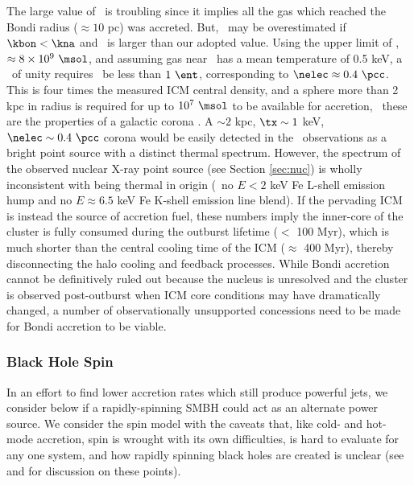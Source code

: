 \documentclass[11pt, preprint]{aastex}
\begin{document}
The large value of \dmb\ is troubling since it implies all the gas
which reached the Bondi radius ($\approx 10$ pc) was accreted. But,
\dmb\ may be overestimated if $\kbon < \kna$ and \mbh\ is larger than
our adopted value. Using the upper limit of \mbh, $\approx 8 \times
10^9 ~\msol$, and assuming gas near \rbon\ has a mean temperature of
0.5 keV, a \dmb\ of unity requires \kbon\ be less than $1 ~\ent$,
corresponding to $\nelec \approx 0.4 ~\pcc$. This is four times the
measured ICM central density, and a sphere more than 2 kpc in radius
is required for up to $10^7 ~\msol$ to be available for accretion,
\ie\ these are the properties of a galactic corona \citep{coronae}. A
$\sim 2$ kpc, $\tx \sim 1$ keV, $\nelec \sim 0.4 ~\pcc$ corona would
be easily detected in the \cxo\ observations as a bright point source
with a distinct thermal spectrum. However, the spectrum of the
observed nuclear X-ray point source (see Section \ref{sec:nuc}) is
wholly inconsistent with being thermal in origin (\ie\ no $E < 2$ keV
Fe L-shell emission hump and no $E \approx 6.5$ keV Fe K-shell
emission line blend). If the pervading ICM is instead the source of
accretion fuel, these numbers imply the inner-core of the cluster is
fully consumed during the outburst lifetime ($<$ 100 Myr), which is
much shorter than the central cooling time of the ICM ($\approx$ 400
Myr), thereby disconnecting the halo cooling and feedback
processes. While Bondi accretion cannot be definitively ruled out
because the nucleus is unresolved and the cluster is observed
post-outburst when ICM core conditions may have dramatically changed,
a number of observationally unsupported concessions need to be made
for Bondi accretion to be viable.

\subsubsection{Black Hole Spin}

In an effort to find lower accretion rates which still produce
powerful jets, we consider below if a rapidly-spinning SMBH could act
as an alternate power source. We consider the spin model with the
caveats that, like cold- and hot-mode accretion, spin is wrought with
its own difficulties, is hard to evaluate for any one system, and how
rapidly spinning black holes are created is unclear (see
\citealt{msspin} and \citealt{minaspin} for discussion on these
points).
\end{document}
